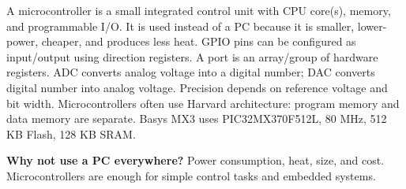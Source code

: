 \documentclass[9pt,a4paper]{article}
\begin{document}
A microcontroller is a small integrated control unit with CPU core(s), memory, and programmable I/O. It is used instead of a PC because it is smaller, lower-power, cheaper, and produces less heat. GPIO pins can be configured as input/output using direction registers. A port is an array/group of hardware registers. ADC converts analog voltage into a digital number; DAC converts digital number into analog voltage. Precision depends on reference voltage and bit width. Microcontrollers often use Harvard architecture: program memory and data memory are separate. Basys MX3 uses PIC32MX370F512L, 80 MHz, 512 KB Flash, 128 KB SRAM.

\begin{exam}
\textbf{Why not use a PC everywhere?} Power consumption, heat, size, and cost. Microcontrollers are enough for simple control tasks and embedded systems.
\end{exam}
\end{document}
